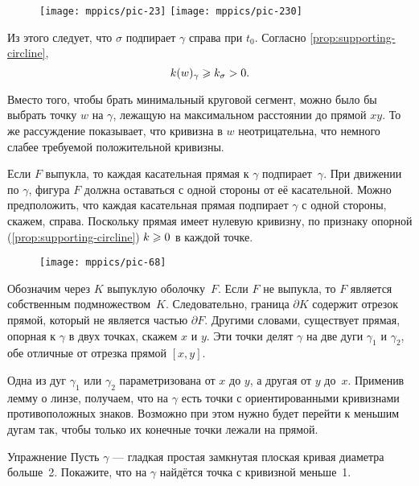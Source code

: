 \begin{wrapfigure}{o}{50 mm}
\vskip-4mm
\centering
\texttt{[image: mppics/pic-23]}
\bigskip
\texttt{[image: mppics/pic-230]}
\end{wrapfigure}

Из этого следует, что $\sigma$ подпирает $\gamma$ справа при $t_0$.
Согласно \ref{prop:supporting-circline},
\[k(w)_\gamma\geqslant k_\sigma >0.\]
\qedsf

Вместо того, чтобы брать минимальный круговой сегмент, можно было бы выбрать точку $w$ на $\gamma$, лежащую на максимальном расстоянии до прямой $xy$.
То же рассуждение показывает, что кривизна в $w$ неотрицательна, что немного слабее требуемой положительной кривизны.


Если $F$ выпукла, то каждая касательная прямая к $\gamma$ подпирает~$\gamma$.
При движении по $\gamma$, фигура $F$ должна оставаться с одной стороны от её касательной.
Можно предположить, что каждая касательная прямая подпирает $\gamma$ с одной стороны, скажем, справа.
Поскольку прямая имеет нулевую кривизну, по признаку опорной (\ref{prop:supporting-circline}) $k\geqslant 0$ в каждой точке.

\begin{wrapfigure}{r}{35 mm}
\vskip-3mm
\centering
\texttt{[image: mppics/pic-68]}
\vskip0mm
\end{wrapfigure}

Обозначим через $K$ выпуклую оболочку~$F$.
Если $F$ не выпукла, то $F$ является собственным подмножеством~$K$.
Следовательно, граница $\partial K$ содержит отрезок прямой, который не является частью $\partial F$.
Другими словами, существует прямая, опорная к $\gamma$ в двух точках, скажем $x$ и $y$.
Эти точки делят $\gamma$ на две дуги $\gamma_1$ и $\gamma_2$, обе отличные от отрезка прямой $[x,y]$.

Одна из дуг $\gamma_1$ или $\gamma_2$ параметризована от $x$ до $y$, а другая от $y$ до~$x$.
Применив лемму о линзе, получаем, что на $\gamma$ есть точки с ориентированными кривизнами противоположных знаков.
Возможно при этом нужно будет перейти к меньшим дугам так, чтобы только их конечные точки лежали на прямой. 
\qeds


\begin{thm}{Упражнение}\label{ex:convex small}
Пусть $\gamma$ --- гладкая простая замкнутая плоская кривая диаметра больше~2.
Покажите, что на $\gamma$ найдётся точка с кривизной меньше~1.
\end{thm}

